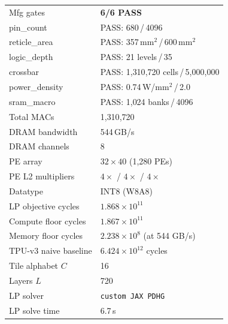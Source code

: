 \begin{table}[h]
\begin{tabular}{@{}ll@{}}
\midrule
Mfg gates               & \textcolor{green!60!black}{\textbf{6/6 PASS}} \\
\quad pin\_count         & PASS: 680\,/\,4096 \\
\quad reticle\_area      & PASS: 357\,mm$^2$\,/\,600\,mm$^2$ \\
\quad logic\_depth       & PASS: 21 levels\,/\,35 \\
\quad crossbar           & PASS: 1{,}310{,}720 cells\,/\,5{,}000{,}000 \\
\quad power\_density     & PASS: 0.74\,W/mm$^2$\,/\,2.0 \\
\quad sram\_macro        & PASS: 1{,}024 banks\,/\,4096 \\
\midrule
Total MACs              & 1{,}310{,}720 \\
DRAM bandwidth          & 544\,GB/s \\
DRAM channels           & 8 \\
PE array                & $32 \times 40$ (1{,}280 PEs) \\
PE L2 multipliers       & $4\times$ / $4\times$ / $4\times$ \\
Datatype                & INT8 (W8A8) \\
LP objective cycles     & $1.868 \times 10^{11}$ \\
Compute floor cycles    & $1.867 \times 10^{11}$ \\
Memory floor cycles     & $2.238 \times 10^{8}$ (at 544 GB/s) \\
TPU-v3 naive baseline   & $6.424 \times 10^{12}$ cycles \\
Tile alphabet $C$       & 16 \\
Layers $L$              & 720 \\
LP solver               & \texttt{custom JAX PDHG} \\
LP solve time           & 6.7\,s \\
\bottomrule
\end{tabular}
\end{table}


